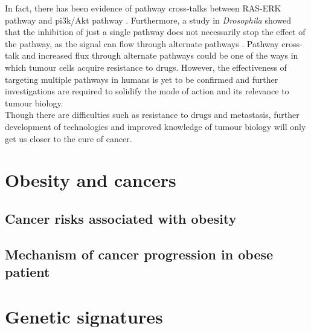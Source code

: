 In fact, there has been evidence of pathway cross-talks between RAS-ERK pathway and \gls{pi3k}/Akt pathway \citep{Moelling2002,Zimmermann1999a}.
Furthermore, a study in \textit{Drosophila} showed that the inhibition of just a single pathway does not necessarily stop the effect of the pathway, as the signal can flow through alternate pathways \citep{Dar2012}.
Pathway cross-talk and increased flux through alternate pathways could be one of the ways in which tumour cells acquire resistance to drugs.
However, the effectiveness of targeting multiple pathways in humans is yet to be confirmed and further investigations are required to solidify the mode of action and its relevance to tumour biology.
\\

\noindent
Though there are difficulties such as resistance to drugs and metastasis, further development of technologies and improved knowledge of tumour biology will only get us closer to the cure of cancer.

\section{Obesity and cancers}
\label{sec:obesity_and_cancers}

\subsection{Cancer risks associated with obesity}
\label{sub:cancer_risks_associated_with_obesity}

\citep{Calle2003}

\subsection{Mechanism of cancer progression in obese patient}
\label{sub:mechanism_of_cancer_progression_in_obese_patient}





\section{Genetic signatures}
\label{sec:genetic_signatures}

